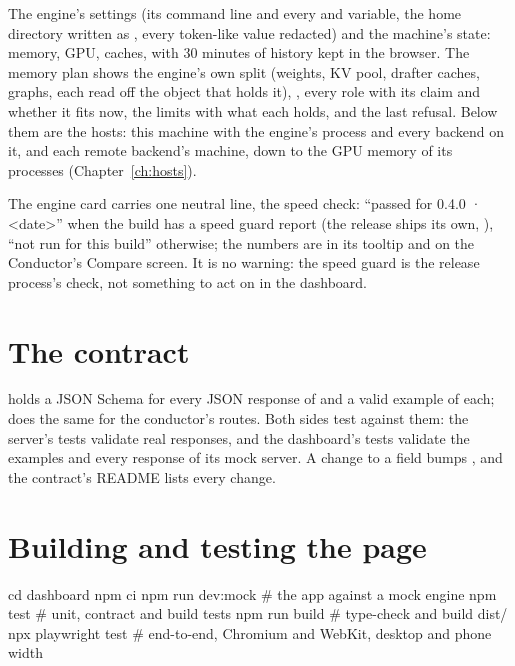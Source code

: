 The engine's settings (its command line and every  and  variable, the home directory written as \code{~}, every token-like value redacted) and the machine's state: memory, GPU, caches, with 30 minutes of history kept in the browser. The memory plan shows the engine's own split (weights, KV pool, drafter caches, graphs, each read off the object that holds it), , every role with its claim and whether it fits now, the limits with what each holds, and the last refusal. Below them are the hosts: this machine with the engine's process and every backend on it, and each remote backend's machine, down to the GPU memory of its processes (Chapter~\ref{ch:hosts}).

The engine card carries one neutral line, the speed check: \enquote{passed for 0.4.0 · <date>} when the build has a speed guard report (the release ships its own, ), \enquote{not run for this build} otherwise; the numbers are in its tooltip and on the Conductor's Compare screen. It is no warning: the speed guard is the release process's check, not something to act on in the dashboard.


\section{The contract}

 holds a JSON Schema for every JSON response of  and a valid example of each;  does the same for the conductor's routes. Both sides test against them: the server's tests validate real responses, and the dashboard's tests validate the examples and every response of its mock server. A change to a field bumps , and the contract's README lists every change.

\section{Building and testing the page}

\begin{shell}
cd dashboard
npm ci
npm run dev:mock        # the app against a mock engine
npm test                # unit, contract and build tests
npm run build           # type-check and build dist/
npx playwright test     # end-to-end, Chromium and WebKit, desktop and phone width
\end{shell}


